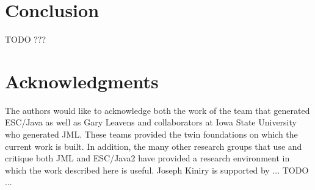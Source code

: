 \documentclass{acm_proc_article-sp}
\begin{document}
\section{Conclusion}
TODO ???

\section{Acknowledgments}
The authors would like to acknowledge both the work of the team that generated
ESC/Java as well as Gary Leavens and collaborators at Iowa State University who
generated JML.  These teams provided the twin foundations on which the current
 work is built.
In addition, the many other research groups that use and critique both 
JML and ESC/Java2 have
provided a research environment in which the work described here is useful.
Joseph Kiniry is supported by ... TODO ...

%

  
%
%
\balancecolumns

\end{document}
